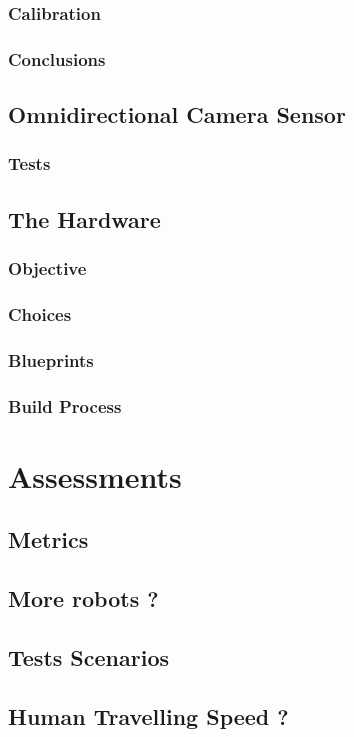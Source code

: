 \documentclass[a4paper, 12pt]{report}
\begin{document}
		\subsection{Calibration}
		\subsection{Conclusions}

	\section{Omnidirectional Camera Sensor}
		\subsection{Tests}

	\section{The Hardware}
		\subsection{Objective}
		\subsection{Choices}
		\subsection{Blueprints}
		\subsection{Build Process}

\chapter{Assessments}
	\section{Metrics}
	\section{More robots ?}
	\section{Tests Scenarios}
	\section{Human Travelling Speed ?}
\end{document}

